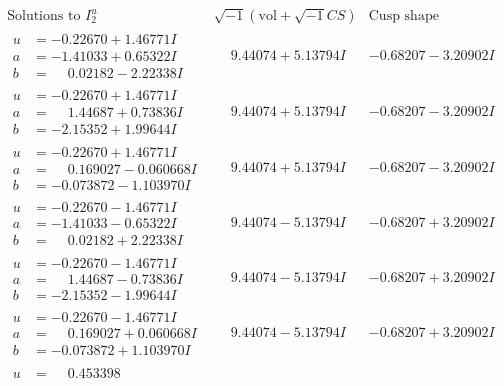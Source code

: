 \documentclass[1p]{elsarticle_modified}
\theoremstyle{definition}
\newcommand{\I}{\sqrt{-1}}
\begin{document}
$$\begin{array}{c|c|c}  
\text{Solutions to }I^u_{2}& \I (\text{vol} + \sqrt{-1}CS) & \text{Cusp shape}\\
 \hline 
\begin{aligned}
u &= -0.22670 + 1.46771 I \\
a &= -1.41033 + 0.65322 I \\
b &= \phantom{-}0.02182 - 2.22338 I\end{aligned}
 & \phantom{-}9.44074 + 5.13794 I & -0.68207 - 3.20902 I \\ \hline\begin{aligned}
u &= -0.22670 + 1.46771 I \\
a &= \phantom{-}1.44687 + 0.73836 I \\
b &= -2.15352 + 1.99644 I\end{aligned}
 & \phantom{-}9.44074 + 5.13794 I & -0.68207 - 3.20902 I \\ \hline\begin{aligned}
u &= -0.22670 + 1.46771 I \\
a &= \phantom{-}0.169027 - 0.060668 I \\
b &= -0.073872 - 1.103970 I\end{aligned}
 & \phantom{-}9.44074 + 5.13794 I & -0.68207 - 3.20902 I \\ \hline\begin{aligned}
u &= -0.22670 - 1.46771 I \\
a &= -1.41033 - 0.65322 I \\
b &= \phantom{-}0.02182 + 2.22338 I\end{aligned}
 & \phantom{-}9.44074 - 5.13794 I & -0.68207 + 3.20902 I \\ \hline\begin{aligned}
u &= -0.22670 - 1.46771 I \\
a &= \phantom{-}1.44687 - 0.73836 I \\
b &= -2.15352 - 1.99644 I\end{aligned}
 & \phantom{-}9.44074 - 5.13794 I & -0.68207 + 3.20902 I \\ \hline\begin{aligned}
u &= -0.22670 - 1.46771 I \\
a &= \phantom{-}0.169027 + 0.060668 I \\
b &= -0.073872 + 1.103970 I\end{aligned}
 & \phantom{-}9.44074 - 5.13794 I & -0.68207 + 3.20902 I \\ \hline\begin{aligned}
u &= \phantom{-}0.453398\phantom{ +0.000000I} \\

\end{aligned}
\end{array}$$
\end{document}

